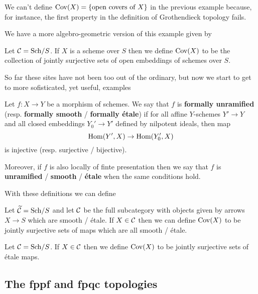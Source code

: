 \begin{remark}
We can't define $\operatorname{Cov}(X)=\left\{{\text{open covers of $X$}}\right\}$ in the previous example because, for instance, the first property in the definition of Grothendieck topology fails.
\end{remark}

We have a more algebro-geometric version of this example given by

\begin{example}
Let $\mathcal{C}=\mathrm{Sch}/S$. If $X$ is a scheme over $S$ then we define $\operatorname{Cov}(X)$ to be the collection of jointly surjective sets of open embeddings of schemes over $S$.
\end{example}


So far these sites have not been too out of the ordinary, but now we start to get to more sofisticated, yet useful, examples

\begin{definition}[]
Let $f:X\to Y$ be a morphism of schemes. We say that $f$ is \textbf{formally unramified} (resp.  \textbf{formally smooth} / \textbf{formally \'etale}) if for all affine $Y$-schemes $Y'\to Y$ and all closed embeddings $Y_0'\to Y'$ defined by nilpotent ideals, then map
\[\operatorname{Hom}(Y',X)\to \operatorname{Hom}(Y_0',X)\]
is injective (resp. surjective / bijective).

Moreover, if $f$ is also locally of finte presentation then we say that $f$ is \textbf{unramified} / \textbf{smooth} / \textbf{\'etale} when the same conditions hold.
\end{definition}

With these definitions we can define
\begin{example}
Let $\widetilde{\mathcal{C}}=\mathrm{Sch}/S$ and let $\mathcal{C}$ be the full subcategory with objects given by arrows $X\to S$ which are smooth / \'etale. If $X\in \mathcal{C}$ then we can define $\operatorname{Cov}(X)$ to be jointly surjective sets of maps which are all smooth / \'etale.
\end{example}


\begin{example}
Let $\mathcal{C}=\mathrm{Sch}/S$. If $X\in \mathcal{C}$ then we define $\operatorname{Cov}(X)$ to be jointly surjective sets of \'etale maps.
\end{example}



\subsection{The fppf and fpqc topologies}

